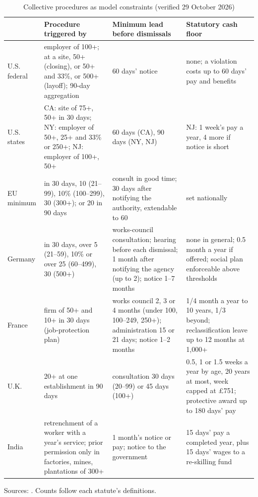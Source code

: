 \begin{table}[t]
\centering
\caption{Collective procedures as model constraints (verified 29 October 2026)}\label{tab:labor-rules}
\scriptsize
\setlength{\tabcolsep}{3pt}
\begin{tabular}{@{}p{1.65cm}p{4.4cm}p{4.6cm}p{5.15cm}@{}}
\toprule
& Procedure triggered by & Minimum lead before dismissals & Statutory cash floor\\
\midrule
U.S. federal & employer of 100+; at a site, 50+ (closing), or 50+ and 33\%, or 500+ (layoff); 90-day aggregation & 60 days' notice & none; a violation costs up to 60 days' pay and benefits\\
U.S. states & CA: site of 75+, 50+ in 30 days; NY: employer of 50+, 25+ and 33\% or 250+; NJ: employer of 100+, 50+ & 60 days (CA), 90 days (NY, NJ) & NJ: 1 week's pay a year, 4 more if notice is short\\
EU minimum & in 30 days, 10 (21--99), 10\% (100--299), 30 (300+); or 20 in 90 days & consult in good time; 30 days after notifying the authority, extendable to 60 & set nationally\\
Germany & in 30 days, over 5 (21--59), 10\% or over 25 (60--499), 30 (500+) & works-council consultation; hearing before each dismissal; 1 month after notifying the agency (up to 2); notice 1--7 months & none in general; 0.5 month a year if offered; social plan enforceable above thresholds\\
France & firm of 50+ and 10+ in 30 days (job-protection plan) & works council 2, 3 or 4 months (under 100, 100--249, 250+); administration 15 or 21 days; notice 1--2 months & 1/4 month a year to 10 years, 1/3 beyond; reclassification leave up to 12 months at 1,000+\\
U.K. & 20+ at one establishment in 90 days & consultation 30 days (20--99) or 45 days (100+) & 0.5, 1 or 1.5 weeks a year by age, 20 years at most, week capped at \pounds751; protective award up to 180 days' pay\\
India & retrenchment of a worker with a year's service; prior permission only in factories, mines, plantations of 300+ & 1 month's notice or pay; notice to the government & 15 days' pay a completed year, plus 15 days' wages to a re-skilling fund\\
\bottomrule
\end{tabular}

\smallskip
\parbox{\textwidth}{\scriptsize Sources: \citet{us2023warn,cfr2026warn,ca2026warn,nydol2026warn,njdol2026warn,eu1998directive,de2026kschg,de2026betrvg,de2026bgb,fr2026codetravail,uk2026tulrca,uk2026era1996,uk2025era,cipp2026limits,in2020irc,vvgnli2020irc,eu2024regulation,eu2026regulation}. Counts follow each statute's definitions.}
\end{table}

